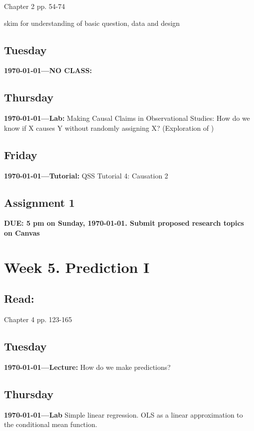 \citet{Imai2022-pm} Chapter 2 pp. 54-74

\citet{FERWERDA2014} skim for understanding of basic question, data and design


\subsection{Tuesday} \textbf{\today---NO CLASS:} 


\AdvanceDate[2]

\subsection{Thursday} \textbf{\today---Lab:}  Making Causal Claims in Observational Studies: How do we know if X causes Y without randomly assigning X? (Exploration of \citet{FERWERDA2014})

\AdvanceDate[1]
\subsection{Friday} \textbf{\today---Tutorial:} QSS Tutorial 4: Causation 2
\AdvanceDate[2]

\vspace{2em}

\subsection{Assignment 1} \textbf{DUE: 5 pm on Sunday, \today. Submit proposed research topics on Canvas}

\AdvanceDate[2]


\vspace{2em}

\section{Week 5. Prediction I}

\subsection{Read:}

\citet{Imai2022-pm} Chapter 4 pp. 123-165


\subsection{Tuesday} \textbf{\today---Lecture:} How do we make predictions?
\AdvanceDate[2]

\subsection{Thursday} \textbf{\today---Lab} Simple linear regression. OLS as a linear approximation to the conditional mean function. 

